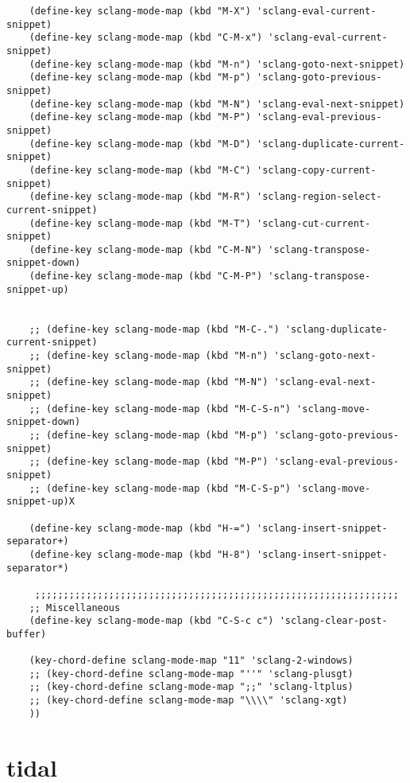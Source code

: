 \documentclass[11pt]{article}
\begin{document}
\begin{verbatim}
    (define-key sclang-mode-map (kbd "M-X") 'sclang-eval-current-snippet)
    (define-key sclang-mode-map (kbd "C-M-x") 'sclang-eval-current-snippet)
    (define-key sclang-mode-map (kbd "M-n") 'sclang-goto-next-snippet)
    (define-key sclang-mode-map (kbd "M-p") 'sclang-goto-previous-snippet)
    (define-key sclang-mode-map (kbd "M-N") 'sclang-eval-next-snippet)
    (define-key sclang-mode-map (kbd "M-P") 'sclang-eval-previous-snippet)
    (define-key sclang-mode-map (kbd "M-D") 'sclang-duplicate-current-snippet)
    (define-key sclang-mode-map (kbd "M-C") 'sclang-copy-current-snippet)
    (define-key sclang-mode-map (kbd "M-R") 'sclang-region-select-current-snippet)
    (define-key sclang-mode-map (kbd "M-T") 'sclang-cut-current-snippet)
    (define-key sclang-mode-map (kbd "C-M-N") 'sclang-transpose-snippet-down)
    (define-key sclang-mode-map (kbd "C-M-P") 'sclang-transpose-snippet-up)


    ;; (define-key sclang-mode-map (kbd "M-C-.") 'sclang-duplicate-current-snippet)
    ;; (define-key sclang-mode-map (kbd "M-n") 'sclang-goto-next-snippet)
    ;; (define-key sclang-mode-map (kbd "M-N") 'sclang-eval-next-snippet)
    ;; (define-key sclang-mode-map (kbd "M-C-S-n") 'sclang-move-snippet-down)
    ;; (define-key sclang-mode-map (kbd "M-p") 'sclang-goto-previous-snippet)
    ;; (define-key sclang-mode-map (kbd "M-P") 'sclang-eval-previous-snippet)
    ;; (define-key sclang-mode-map (kbd "M-C-S-p") 'sclang-move-snippet-up)X

    (define-key sclang-mode-map (kbd "H-=") 'sclang-insert-snippet-separator+)
    (define-key sclang-mode-map (kbd "H-8") 'sclang-insert-snippet-separator*)

     ;;;;;;;;;;;;;;;;;;;;;;;;;;;;;;;;;;;;;;;;;;;;;;;;;;;;;;;;;;;;;;;;
    ;; Miscellaneous
    (define-key sclang-mode-map (kbd "C-S-c c") 'sclang-clear-post-buffer)

    (key-chord-define sclang-mode-map "11" 'sclang-2-windows)
    ;; (key-chord-define sclang-mode-map "''" 'sclang-plusgt)
    ;; (key-chord-define sclang-mode-map ";;" 'sclang-ltplus)
    ;; (key-chord-define sclang-mode-map "\\\\" 'sclang-xgt)
    ))
\end{verbatim}

\section{tidal}
\label{sec:org5904403}
\end{document}
